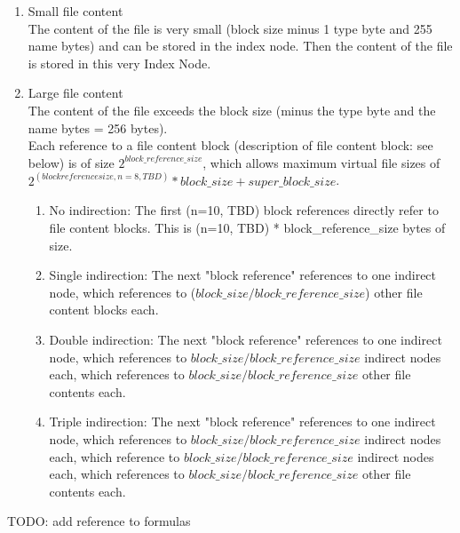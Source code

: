 \documentclass[JCDReport.tex]{subfiles}
\begin{document}
\begin{enumerate}
  \item Small file content\\
  The content of the file is very small (block size minus 1 type byte and 255 name bytes) and can be stored in the index node. Then the content of the file is stored in this very Index Node.
  \item Large file content\\
The content of the file exceeds the block size (minus the type byte and the name bytes = 256 bytes).\\
Each reference to a file content block (description of file content block: see below) is of size $2^{block\_reference\_size}$, which allows maximum virtual file sizes of $2^{(block reference size, n=8, TBD)} * block\_size + super\_block\_size$.\\
\begin{enumerate}
  \item No indirection: The first (n=10, TBD) block references directly refer to file content blocks. This is (n=10, TBD) * block\_reference\_size bytes of size.
  \item Single indirection: The next "block reference" references to one indirect node, which references to ($block\_size / block\_reference\_size$) other file content blocks each.
  \item Double indirection: The next "block reference" references to one indirect node, which references to $block\_size / block\_reference\_size$ indirect nodes each, which references to $block\_size / block\_reference\_size$ other file contents each.
  \item Triple indirection: The next "block reference" references to one indirect node, which references to $block\_size / block\_reference\_size$ indirect nodes each, which reference to $block\_size / block\_reference\_size$ indirect nodes each, which references to $block\_size / block\_reference\_size$ other file contents each.
\end{enumerate}
\end{enumerate}

TODO: add reference to formulas\\
\end{document}

